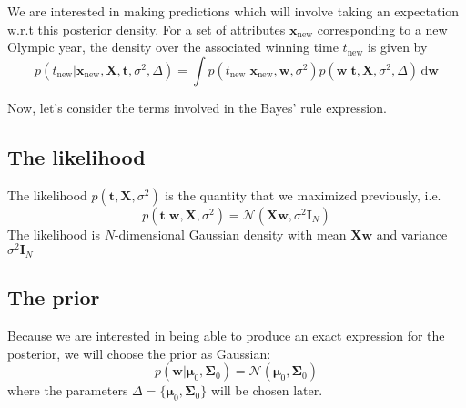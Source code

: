 \documentclass[a4paper,11pt]{article} %
\begin{document}
We are interested in making predictions which will involve taking an expectation
w.r.t this posterior density.
For a set of attributes $\mathbf{x}_{\mathrm{new}}$ corresponding to a new Olympic
year, the density over the associated winning time $t_{\mathrm{new}}$ is given
by
\begin{equation}
p(t_{\mathrm{new}} | \mathbf{x}_{\mathrm{new}},\mathbf{X}, \mathbf{t}, \sigma^2,\Delta) =
\int p(t_{\mathrm{new}} | \mathbf{x}_{\mathrm{new}}, \mathbf{w}, \sigma^2)
p(\mathbf{w} | \mathbf{t}, \mathbf{X}, \sigma^2, \Delta)\,\mathrm{d}\mathbf{w}
\end{equation}

Now, let's consider the terms involved in the Bayes' rule expression.

\subsection{The likelihood}
The likelihood $p(\mathbf{t}, \mathbf{X}, \sigma^2)$ is the quantity that we
maximized previously, i.e.
\begin{equation}
p(\mathbf{t} | \mathbf{w}, \mathbf{X}, \sigma^2 ) =
\mathcal{N}( \mathbf{Xw}, \sigma^2\mathbf{I}_{N} )
\end{equation}
The likelihood is $N$-dimensional Gaussian density with mean $\mathbf{Xw}$ and
variance $\sigma^2\mathbf{I}_{N}$

\subsection{The prior}
Because we are interested in being able to produce an exact expression for the posterior,
we will choose the prior as Gaussian:
\begin{equation}
p(\mathbf{w} | \boldsymbol{\mu}_{0}, \boldsymbol{\Sigma}_{0}) = 
\mathcal{N}(\boldsymbol{\mu}_{0}, \boldsymbol{\Sigma}_{0})
\end{equation}
where the parameters $\Delta = \{ \boldsymbol{\mu}_{0}, \boldsymbol{\Sigma}_{0}\}$
will be chosen later.
\end{document}
